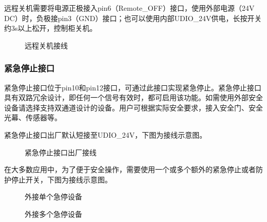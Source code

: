 \documentclass[a4paper,11pt,english,openany,oneside]{sphinxmanual}
\begin{document}
\sphinxAtStartPar
{}

\sphinxAtStartPar
远程关机需要将电源正极接入pin6（Remote\_OFF）接口，使用外部电源（24V DC）时，负极接pin3（GND）接口；也可以使用内部UDIO\_24V供电，长按开关约3s以上松开，控制柜关机。

\begin{figure}[H]
\centering
\capstart

\noindent{}
\caption{远程关机接线}\label{\detokenize{08 _u5b89_u88c5_u4e0e_u8c03_u8bd5:id122}}\end{figure}




\subsubsection{紧急停止接口}
\label{\detokenize{08 _u5b89_u88c5_u4e0e_u8c03_u8bd5:id73}}
\sphinxAtStartPar
紧急停止接口位于pin10和pin12接口，可通过此接口实现紧急停止。紧急停止接口具有双路冗余设计，即任何一个信号有效时，都可启用该功能。如需使用外部安全设备请选择支持双通道设计的设备。用户可根据实际安全要求，接入安全门、安全光幕、传感器等。

\sphinxAtStartPar
{}

\sphinxAtStartPar
紧急停止接口出厂默认短接至UDIO\_24V，下图为接线示意图。

\begin{figure}[H]
\centering
\capstart

\noindent{}
\caption{紧急停止接口出厂接线}\label{\detokenize{08 _u5b89_u88c5_u4e0e_u8c03_u8bd5:id123}}\end{figure}



\sphinxAtStartPar
{}

\sphinxAtStartPar
在大多数应用中，为了便于安全操作，需要使用一个或多个额外的紧急停止或者防护停止开关，下图为接线示意图。

\begin{figure}[H]
\centering
\capstart

\noindent{}
\caption{外接单个急停设备}\label{\detokenize{08 _u5b89_u88c5_u4e0e_u8c03_u8bd5:id124}}\end{figure}



\begin{figure}[H]
\centering
\capstart

\noindent{}
\caption{外接多个急停设备}\label{\detokenize{08 _u5b89_u88c5_u4e0e_u8c03_u8bd5:id125}}\end{figure}
\end{document}
